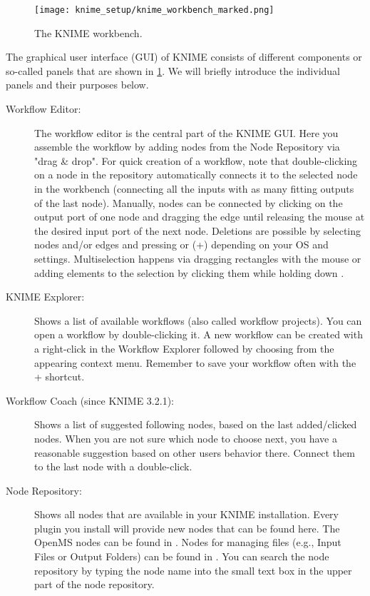 \begin{figure}
\texttt{[image: knime\_setup/knime\_workbench\_marked.png]}
\caption{The KNIME workbench.}
\label{fig:knime_workbench}
\end{figure}

The graphical user interface (GUI) of KNIME consists of different components or so-called panels that are shown in \cref{fig:knime_workbench}.
We will briefly introduce the individual panels and their purposes below.

\begin{description}
\item[Workflow Editor:]
The workflow editor is the central part of the KNIME GUI.
Here you assemble the workflow by adding nodes from the Node Repository via "drag \& drop". For quick creation of a 
workflow, note that double-clicking on 
a node in the repository automatically connects it to the selected node in the workbench (connecting all the inputs 
with as many fitting outputs of the last node).
Manually, nodes can be connected by clicking on the output port of one node and dragging the edge until releasing the 
mouse at the desired input port of the next node. Deletions are possible by selecting nodes and/or edges and pressing 
 or (+) depending on your OS and settings. Multiselection happens via dragging 
rectangles with the mouse or adding elements to the selection by clicking them while holding down .

\item[KNIME Explorer:]
Shows a list of available workflows (also called workflow projects).
You can open a workflow by double-clicking it.
A new workflow can be created with a right-click in the Workflow Explorer followed by choosing  from the appearing context menu.
Remember to save your workflow often with the + shortcut.

\item[Workflow Coach (since KNIME 3.2.1):]
Shows a list of suggested following nodes, based on the last added/clicked nodes.
When you are not sure which node to choose next, you have a reasonable suggestion based on other users behavior 
there. Connect them to the last node with a double-click.

\item[Node Repository:]
Shows all nodes that are available in your KNIME installation.
Every plugin you install will provide new nodes that can be found here.
The OpenMS nodes can be found in .
Nodes for managing files (e.g., Input Files or Output Folders) can be found in .
You can search the node repository by typing the node name into the small text box in the upper part of the node repository.


\end{description}
